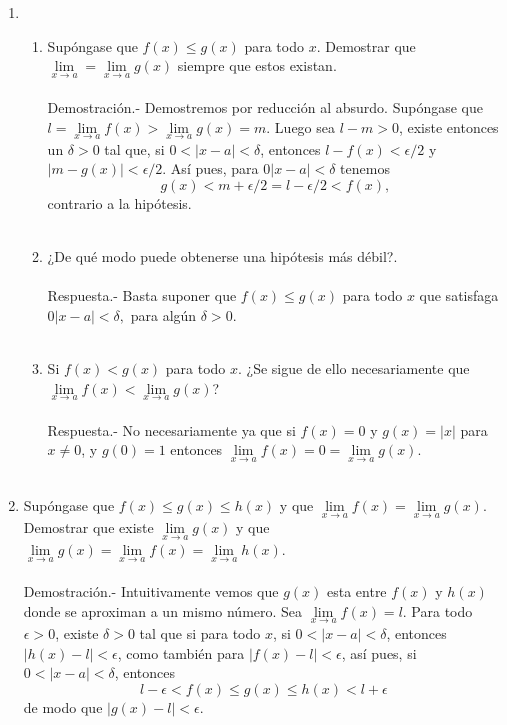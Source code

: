 \begin{enumerate}
\item 
\begin{enumerate}[\bfseries (a)]

    \item Supóngase que $f(x)\leq g(x)$ para todo $x$. Demostrar que $\lim\limits_{x \to a} = \lim\limits_{x\to a} g(x)$ siempre que estos existan.\\\\
	Demostración.-\; Demostremos por reducción al absurdo. Supóngase que $l = \lim\limits_{x\to a} f(x) > \lim\limits_{x\to a} g(x) = m$. Luego sea $l-m>0$, existe entonces un $\delta > 0$ tal que, si $0<|x-a|<\delta$, entonces $l-f(x)<\epsilon/2$ y $|m-g(x)|<\epsilon/2$. Así pues, para $0|x-a|<\delta$ tenemos $$g(x)<m+\epsilon/2 = l - \epsilon/2 < f(x),$$ contrario a la hipótesis.\\\\

    \item ¿De qué modo puede obtenerse una hipótesis más débil?.\\\\
	Respuesta.-\; Basta suponer que $f(x)\leq g(x)$ para todo $x$ que satisfaga $0|x-a|<\delta,$ para algún $\delta>0$.\\\\

    \item Si $f(x)<g(x)$ para todo $x$. ¿Se sigue de ello necesariamente que $\lim\limits_{x\to a}f(x)<\lim\limits_{x\to a}g(x)$?\\\\
	Respuesta.-\; No necesariamente ya que si $f(x)=0$ y $g(x) =  |x|$ para $x\neq 0$, y $g(0) = 1$ entonces $\lim\limits_{x\to a} f(x) = 0 = \lim\limits_{x\to a}g(x)$.\\\\

\end{enumerate}

\item Supóngase que $f(x)\leq g(x) \leq h(x)$ y que $\lim\limits_{x \to a} f(x) = \lim\limits_{x\to a} g(x)$. Demostrar que existe $\lim\limits_{x\to a} g(x)$ y que $\lim\limits_{x\to a} g(x) = \lim\limits_{x\to a} f(x) = \lim\limits_{x\to a} h(x)$.\\\\
	Demostración.-\; Intuitivamente vemos que $g(x)$ esta entre $f(x)$ y $h(x)$ donde se aproximan a un mismo número. Sea $\lim\limits_{x\to a} f(x) = l$. Para todo $\epsilon>0$, existe $\delta>0$ tal que si para todo $x$, si $0<|x-a|<\delta$, entonces $|h(x)-l|<\epsilon$, como también para $|f(x) -l|<\epsilon$, así pues, si $0<|x-a|<\delta$, entonces $$l-\epsilon<f(x)\leq g(x) \leq h(x) < l + \epsilon$$ de modo que $|g(x) - l|<\epsilon$.\\\\


\end{enumerate}
